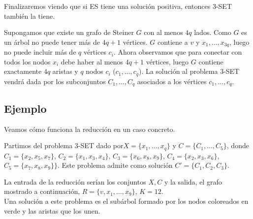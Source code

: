 \documentclass[a4paper, 11pt]{article}
\begin{document}
Finalizaremos viendo que si ES tiene una solución positiva, entonces 3-SET también la tiene.

Supongamos que existe un grafo de Steiner $G$ con al menos $4q$ lados. Como $G$ es un árbol no puede tener más de $4q+1$ vértices. $G$ contiene a $v$ y $x_1,\dots,x_{3q}$, luego no puede incluir más de $q$ vértices $c_i$. Ahora observamos que para conectar con todos los nodos $x_i$ debe haber al menos $4q+1$ vértices, luego $G$ contiene exactamente $4q$ aristas y $q$ nodos $c_i$ ($c_1,\dots,c_q$). La solución al problema 3-SET vendrá dada por los subconjuntos $C_1,\dots,C_q$ asociados a los vértices $c_1,\dots,c_q$.

\subsection*{Ejemplo}
Veamos cómo funciona la reducción en un caso concreto.

Partimos del problema 3-SET dado por$X=\{x_1,\dots,x_q\}$ y $C=\{C_1,\dots,C_5\}$, donde $C_1=\{x_2, x_5, x_7\}$, $C_2=\{x_1,x_3,x_4\}$, $C_3=\{x_6,x_8,x_9\}$, $C_4=\{x_2,x_3,x_6\}$, $C_5=\{x_7,x_8,x_9\}\}$. Este problema admite como solución $C'=\{C_1,C_2,C_3\}$.

La entrada de la reducción serían los conjuntos $X, C$ y la salida, el grafo mostrado a continuación, $R=\{v,x_1,\dots,x_9\}$, $K=12$.\\



Una solución a este problema es el subárbol formado por los nodos coloreados en verde y las aristas que los unen.
\end{document}
